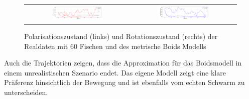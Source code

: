 \begin{refsection}
\begin{figure}[H]
\centering
\begin{tabular}{cc}
\includegraphics[width=0.5\textwidth]{figures/Experimente/Realdaten/Boids_60F_zust_Pol.png} &
\includegraphics[width=0.5\textwidth]{figures/Experimente/Realdaten/Boids_60F_zust_Rot.png} 
\end{tabular}
\caption{Polarisationszustand (links) und Rotationszustand (rechts) der Realdaten mit 60 Fischen und des metrische Boids Modells\label{fig:60Fisch_pol_boids}}
\end{figure}

Auch die Trajektorien zeigen, dass die Approximation für das Boidsmodell in einem unrealistischen Szenario endet.
Das eigene Modell zeigt eine klare Präferenz hinsichtlich der Bewegung und ist ebenfalls vom echten Schwarm zu unterscheiden.


\end{refsection}
